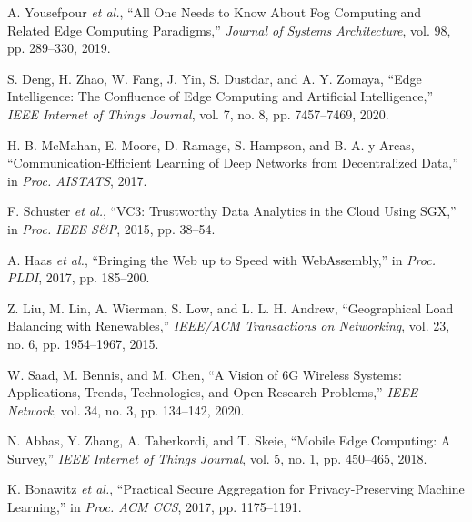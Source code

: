 \documentclass[conference]{IEEEtran}
\begin{document}
\begin{thebibliography}{99}
A. Yousefpour \emph{et al.}, ``All One Needs to Know About Fog Computing and Related Edge Computing Paradigms,'' \emph{Journal of Systems Architecture}, vol. 98, pp. 289--330, 2019.

S. Deng, H. Zhao, W. Fang, J. Yin, S. Dustdar, and A. Y. Zomaya, ``Edge Intelligence: The Confluence of Edge Computing and Artificial Intelligence,'' \emph{IEEE Internet of Things Journal}, vol. 7, no. 8, pp. 7457--7469, 2020.

H. B. McMahan, E. Moore, D. Ramage, S. Hampson, and B. A. y Arcas, ``Communication-Efficient Learning of Deep Networks from Decentralized Data,'' in \emph{Proc. AISTATS}, 2017.

F. Schuster \emph{et al.}, ``VC3: Trustworthy Data Analytics in the Cloud Using SGX,'' in \emph{Proc. IEEE S\&P}, 2015, pp. 38--54.

A. Haas \emph{et al.}, ``Bringing the Web up to Speed with WebAssembly,'' in \emph{Proc. PLDI}, 2017, pp. 185--200.

Z. Liu, M. Lin, A. Wierman, S. Low, and L. L. H. Andrew, ``Geographical Load Balancing with Renewables,'' \emph{IEEE/ACM Transactions on Networking}, vol. 23, no. 6, pp. 1954--1967, 2015.

W. Saad, M. Bennis, and M. Chen, ``A Vision of 6G Wireless Systems: Applications, Trends, Technologies, and Open Research Problems,'' \emph{IEEE Network}, vol. 34, no. 3, pp. 134--142, 2020.

N. Abbas, Y. Zhang, A. Taherkordi, and T. Skeie, ``Mobile Edge Computing: A Survey,'' \emph{IEEE Internet of Things Journal}, vol. 5, no. 1, pp. 450--465, 2018.

K. Bonawitz \emph{et al.}, ``Practical Secure Aggregation for Privacy-Preserving Machine Learning,'' in \emph{Proc. ACM CCS}, 2017, pp. 1175--1191.

\end{thebibliography}
\end{document}
